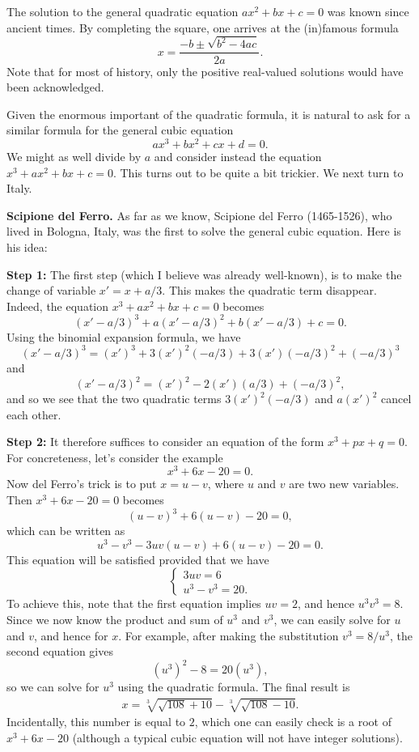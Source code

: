 \documentclass[11pt, reqno]{amsart}
\theoremstyle{remark}
\numberwithin{equation}{subsection}
\numberwithin{figure}{section}
\numberwithin{table}{section}
\newcommand{\sss}{\vspace{2.5 mm}}
\begin{document}
\sss

The solution to the general quadratic equation $ax^2 + bx + c = 0$ was known since ancient times. By completing the square, one arrives at the (in)famous formula $$x = \frac{-b \pm \sqrt{b^2 - 4ac}}{2a}.$$
Note that for most of history, only the positive real-valued solutions would have been acknowledged.

Given the enormous important of the quadratic formula, it is natural to ask for a similar formula for the general cubic equation
$$ax^3 + bx^2 + cx + d = 0.$$
We might as well divide by $a$ and consider instead the equation $x^3 + ax^2 + bx + c = 0$.
This turns out to be quite a bit trickier.
We next turn to Italy. 

\sss

\textbf{Scipione del Ferro.} As far as we know, Scipione del Ferro (1465-1526), who lived in Bologna, Italy, was the first to solve the general cubic equation.
Here is his idea:

\noindent \textbf{Step 1:} The first step (which I believe was already well-known), is to make the change of variable $x' = x + a/3$.
This makes the quadratic term disappear.
Indeed, the equation $x^3 + ax^2 + bx + c = 0$ becomes
$$(x'-a/3)^3 + a(x' - a/3)^2 + b(x' - a/3) + c = 0.$$
Using the binomial expansion formula,
we have
$$ (x' - a/3)^3 = (x')^3 + 3(x')^2(-a/3) + 3(x')(-a/3)^2 + (-a/3)^3$$
and 
$$(x' - a/3)^2 = (x')^2 - 2(x')(a/3) + (-a/3)^2,$$
and so we see that the two quadratic terms $3(x')^2(-a/3)$ and $a(x')^2$ cancel each other.

\noindent \textbf{Step 2:} It therefore suffices to consider an equation of the form $x^3 + px + q = 0$.
For concreteness, let's consider the example $$x^3 + 6x - 20 = 0.$$
Now del Ferro's trick is to put $x = u - v$, where $u$ and $v$ are two new variables.
Then $x^3 + 6x - 20 = 0$ becomes
$$(u-v)^3 + 6(u-v) - 20 = 0,$$
which can be written as 
$$u^3 - v^3 - 3uv(u-v) + 6(u-v) - 20 = 0.$$
This equation will be satisfied provided that we have
$$\begin{cases}
3uv = 6\\
u^3 - v^3 = 20.
\end{cases}$$
To achieve this, note that the first equation implies $uv = 2$, and hence $u^3v^3 = 8$.
Since we now know the product and sum of $u^3$ and $v^3$, we can easily solve for $u$ and $v$, and hence for $x$.
For example, after making the substitution $v^3 = 8/u^3$, the second equation gives
$$(u^3)^2 - 8 = 20(u^3),$$
so we can solve for $u^3$ using the quadratic formula.
The final result is 
\begin{align*}
x = \sqrt[3]{\sqrt{108}+10} - \sqrt[3]{\sqrt{108}-10}.
\end{align*}
Incidentally, this number is equal to $2$, which one can easily check is a root of $x^3 + 6x - 20$ (although a typical cubic equation will not have integer solutions).
\end{document}
